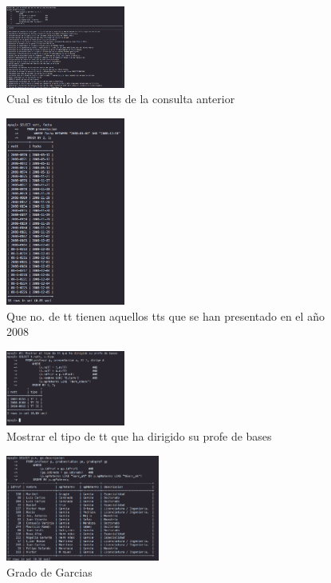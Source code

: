 \documentclass[12pt, fleqn]{article}                             %
\begin{document}
        \begin{figure}[ht!]
            \centering
            \includegraphics[width=0.35\textwidth]{BD4Reporte3}
            \caption{Cual es titulo de los tts de la consulta anterior}
        \end{figure}

        \begin{figure}[ht!]
            \centering
            \includegraphics[width=0.35\textwidth]{BD4Reporte4}
            \caption{Que no. de tt tienen aquellos tts que se han presentado en el año 2008}
        \end{figure}

        \begin{figure}[ht!]
            \centering
            \includegraphics[width=0.35\textwidth]{BD4Reporte5}
            \caption{Mostrar el tipo de tt que ha dirigido su profe de bases}
        \end{figure}


        \begin{figure}[ht!]
            \centering
            \includegraphics[width=0.45\textwidth]{BD4Reporte6}
            \caption{Grado de Garcias}
        \end{figure}
\end{document}
